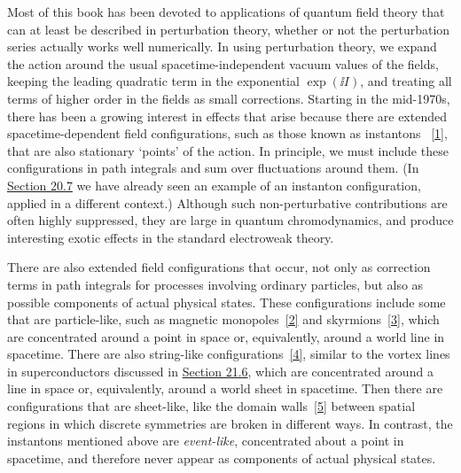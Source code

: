 
Most of this book has been devoted to applications of quantum field theory
that can at least be described in perturbation theory, whether or not the
perturbation series actually works well numerically. In using perturbation
theory, we expand the action around the usual spacetime-independent vacuum
values of the fields, keeping the leading quadratic term in the exponential
$\exp(\ii I)$, and treating all terms of higher order in the fields as small
corrections. Starting in the mid-1970s, there has been a growing interest in
effects that arise because there are extended spacetime-dependent field
configurations, such as those known as instantons%
~\hyperref[ch23-ref-1]{[1]}, that are also stationary `points' of the
action. In principle, we must include these configurations in path integrals
and sum over fluctuations around them. (In
\hyperref[sec:20.7]{Section 20.7} we have already seen an example of an
instanton configuration, applied in a different context.) Although such
non-perturbative contributions are often highly suppressed, they are large
in quantum chromodynamics, and produce interesting exotic effects in the
standard electroweak theory.

There are also extended field configurations that occur, not only as
correction terms in path integrals for processes involving ordinary
particles, but also as possible components of actual physical states. These
configurations include some that are particle-like, such as magnetic
monopoles~\hyperref[ch23-ref-2]{[2]} and
skyrmions~\hyperref[ch23-ref-3]{[3]}, which are concentrated around a point
in space or, equivalently, around a world line in spacetime. There are also
string-like configurations~\hyperref[ch23-ref-4]{[4]}, similar to the
vortex lines in superconductors discussed in
\hyperref[sec:21.6]{Section 21.6}, which are concentrated around a line in
space or, equivalently, around a world sheet in spacetime. Then there are
configurations that are sheet-like, like the domain
walls~\hyperref[ch23-ref-5]{[5]} between spatial regions in which discrete
symmetries are broken in different ways. In contrast, the instantons
mentioned above are \emph{event-like}, concentrated about a point in
spacetime, and therefore never appear as components of actual physical
states.

